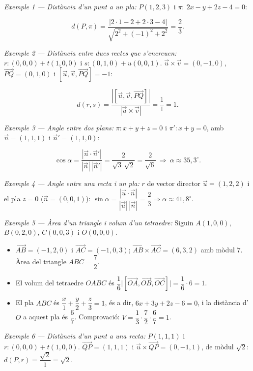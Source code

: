 \emph{Exemple 1 --- Distància d'un punt a un pla:} $P(1,2,3)$ i $\pi:\ 2x-y+2z-4=0$:

\begin{equation*}
d(P,\pi)=\frac{|2\cdot1-2+2\cdot3-4|}{\sqrt{2^2+(-1)^2+2^2}}=\frac{2}{3}.
\end{equation*}

\emph{Exemple 2 --- Distància entre dues rectes que s'encreuen:} $r:(0,0,0)+t(1,0,0)$ i $s:(0,1,0)+u(0,0,1)$. $\vec u\times\vec v=(0,-1,0)$, $\overrightarrow{PQ}=(0,1,0)$ i $[\vec u,\vec v,\overrightarrow{PQ}]=-1$:

\begin{equation*}
d(r,s)=\frac{|[\vec u,\vec v,\overrightarrow{PQ}]|}{|\vec u\times\vec v|}=\frac11=1.
\end{equation*}

\emph{Exemple 3 --- Angle entre dos plans:} $\pi:x+y+z=0$ i $\pi':x+y=0$, amb $\vec n=(1,1,1)$ i $\vec n'=(1,1,0)$:

\begin{equation*}
\cos\alpha=\frac{|\vec n\cdot\vec n'|}{|\vec n|\,|\vec n'|}=\frac{2}{\sqrt3\,\sqrt2}=\frac{2}{\sqrt6}\ \Rightarrow\ \alpha\approx35{,}3^{\circ}.
\end{equation*}

\emph{Exemple 4 --- Angle entre una recta i un pla:} $r$ de vector director $\vec u=(1,2,2)$ i el pla $z=0$ ($\vec n=(0,0,1)$): $\sin\alpha=\dfrac{|\vec u\cdot\vec n|}{|\vec u|\,|\vec n|}=\dfrac23\Rightarrow\alpha\approx41{,}8^{\circ}$.

\emph{Exemple 5 --- Àrea d'un triangle i volum d'un tetraedre:} Siguin $A(1,0,0)$, $B(0,2,0)$, $C(0,0,3)$ i $O(0,0,0)$.

\begin{itemize}
\item $\overrightarrow{AB}=(-1,2,0)$ i $\overrightarrow{AC}=(-1,0,3)$; $\overrightarrow{AB}\times\overrightarrow{AC}=(6,3,2)$ amb mòdul $7$. Àrea del triangle $ABC=\dfrac72$.
\item El volum del tetraedre $OABC$ és $\dfrac16\bigl|[\overrightarrow{OA},\overrightarrow{OB},\overrightarrow{OC}]\bigr|=\dfrac16\cdot6=1$.
\item El pla $ABC$ és $\dfrac x1+\dfrac y2+\dfrac z3=1$, és a dir, $6x+3y+2z-6=0$, i la distància d'$O$ a aquest pla és $\dfrac{6}{7}$. Comprovació: $V=\dfrac13\cdot\dfrac72\cdot\dfrac67=1$.
\end{itemize}

\emph{Exemple 6 --- Distància d'un punt a una recta:} $P(1,1,1)$ i $r:(0,0,0)+t(1,0,0)$. $\overrightarrow{QP}=(1,1,1)$ i $\vec u\times\overrightarrow{QP}=(0,-1,1)$, de mòdul $\sqrt2$: $d(P,r)=\dfrac{\sqrt2}{1}=\sqrt2$.
